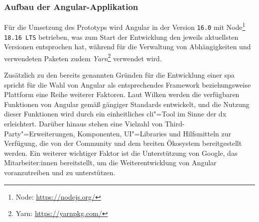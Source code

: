 \documentclass[a4paper,12pt,twoside]{scrreprt}
\begin{document}
\subsubsection*{Aufbau der Angular-Applikation}
\label{sub-sub-sec:aufbau-angular-applikation}

Für die Umsetzung des Prototyps wird Angular in der Version \texttt{16.0} mit Node\footnote{Node: \url{https://nodejs.org/}} \texttt{18.16 LTS} betrieben, was zum Start der Entwicklung den jeweils aktuellsten Versionen entsprochen hat, während für die Verwaltung von Abhängigkeiten und verwendeten Paketen zudem \textit{Yarn}\footnote{Yarn: \url{https://yarnpkg.com/}} verwendet wird.

\medskip

Zusätzlich zu den bereits genannten Gründen für die Entwicklung einer \acl{spa} spricht für die Wahl von Angular als entsprechendes Framework beziehungsweise Plattform eine Reihe weiterer Faktoren. Laut Wilken werden die verfügbaren Funktionen von Angular gemäß gängiger Standards entwickelt, und die Nutzung dieser Funktionen wird durch ein einheitliches \ac{cli}"=Tool im Sinne der \ac{dx} erleichtert. Darüber hinaus stehen eine Vielzahl von Third-Party"=Erweiterungen, Komponenten, UI"=Libraries und Hilfsmitteln zur Verfügung, die von der Community und dem breiten Ökosystem bereitgestellt werden. Ein weiterer wichtiger Faktor ist die Unterstützung von Google, das Mitarbeiter:innen bereitstellt, um die Weiterentwicklung von Angular voranzutreiben und zu unterstützen. \cite[2]{wilken_angular_2018}

\medskip
\end{document}
